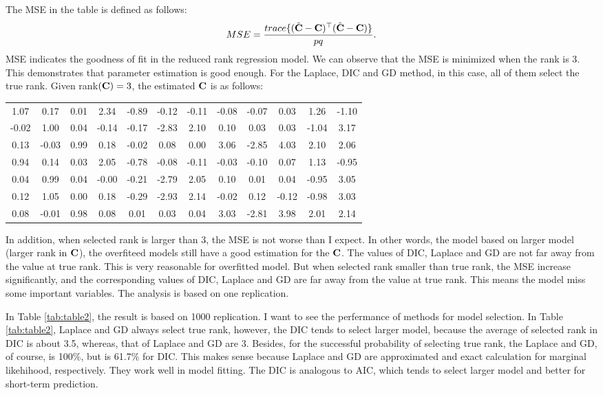 \documentclass[]{book}
\begin{document}
The MSE in the table is defined as follows:
\[
MSE = \frac{trace\{(\hat {\bf C}-{\bf C})^{{\top}}(\hat {\bf C}-{\bf C})\}}{pq}.
\]
MSE indicates the goodness of fit in the reduced rank regression model. We can observe that the MSE is minimized when the rank is 3. This demonstrates that parameter estimation is good enough. For the Laplace, DIC and GD method, in this case, all of them select the true rank. Given rank\(({\bf C})=3\), the estimated \({\bf C}\) is as follows:

\begin{longtable}[]{@{}cccccccccccc@{}}
\toprule
\endhead
1.07 & 0.17 & 0.01 & 2.34 & -0.89 & -0.12 & -0.11 & -0.08 & -0.07 & 0.03 & 1.26 & -1.10\tabularnewline
-0.02 & 1.00 & 0.04 & -0.14 & -0.17 & -2.83 & 2.10 & 0.10 & 0.03 & 0.03 & -1.04 & 3.17\tabularnewline
0.13 & -0.03 & 0.99 & 0.18 & -0.02 & 0.08 & 0.00 & 3.06 & -2.85 & 4.03 & 2.10 & 2.06\tabularnewline
0.94 & 0.14 & 0.03 & 2.05 & -0.78 & -0.08 & -0.11 & -0.03 & -0.10 & 0.07 & 1.13 & -0.95\tabularnewline
0.04 & 0.99 & 0.04 & -0.00 & -0.21 & -2.79 & 2.05 & 0.10 & 0.01 & 0.04 & -0.95 & 3.05\tabularnewline
0.12 & 1.05 & 0.00 & 0.18 & -0.29 & -2.93 & 2.14 & -0.02 & 0.12 & -0.12 & -0.98 & 3.03\tabularnewline
0.08 & -0.01 & 0.98 & 0.08 & 0.01 & 0.03 & 0.04 & 3.03 & -2.81 & 3.98 & 2.01 & 2.14\tabularnewline
\bottomrule
\end{longtable}

In addition, when selected rank is larger than 3, the MSE is not worse than I expect. In
other words, the model based on larger model (larger rank in \({\bf C}\)), the overfiteed models still have a good
estimation for the \({\bf C}\). The values of DIC, Laplace and GD are not far away from the value at true rank.
This is very reasonable for overfitted model. But when selected rank smaller than true rank,
the MSE increase significantly, and the corresponding values of DIC, Laplace and GD are far away from the value at true rank. This means the model miss some important variables. The analysis is based on one replication.

In Table \ref{tab:table2}, the result is based on 1000 replication. I want to see the perfermance of methods for model selection. In
Table \ref{tab:table2}, Laplace and GD always select true rank, however, the DIC tends to select larger model, because the average of
selected rank in DIC is about 3.5, whereas, that of Laplace and GD are 3. Besides, for the successful probability of selecting true
rank, the Laplace and GD, of course, is 100\%, but is 61.7\% for DIC. This makes sense because Laplace and GD are approximated and exact calculation for marginal likehihood, respectively. They work well in model fitting. The DIC is analogous to AIC, which tends to select larger model and better for short-term prediction.
\end{document}
